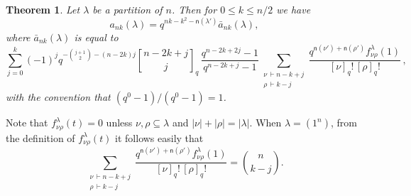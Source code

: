 \documentclass[12pt,a4paper,reqno]{amsart}
\theoremstyle{plain}
\newtheorem{theorem}{Theorem}[section]
\theoremstyle{definition}
\newcommand{\FF}{{\mathbb{F}}}
\newcommand{\1}{\mathds{1}}
\renewcommand{\u}{\mathfrak{u}}
\newcommand{\fn}{\mathsf{n}}
\DeclareMathOperator{\rk}{rank}
\begin{document}
\begin{theorem}\label{anklambda-explicit} Let $\lambda$ be a partition of $n$. Then 
for $0\leq k\leq n/2$ we have 
\[
a_{nk}(\lambda)=q^{nk-k^2-\fn(\lambda')} \bar a_{nk}(\lambda),
\] where $\bar a_{nk}(\lambda)$ is equal to 
\begin{equation*}
\sum_{j=0}^k (-1)^jq^{-\binom{j+1}{2}-(n-2k)j}{n-2k+j\brack j}_q\,\frac{q^{n-2k+2j}-1}{q^{n-2k+j}-1} \sum_{\substack{\nu\, \vdash n-k+j\\ \rho\,\vdash k-j}}\frac{q^{\fn(\nu')+\fn(\rho')}f_{\nu\rho}^\lambda(1)}{[\nu]_q!\,[\rho]_q!}\, ,    
\end{equation*}
with the convention that $(q^0-1)/(q^0-1)=1$. 

  
\end{theorem}
Note that $f_{\nu\rho}^\lambda(t)=0$ unless $\nu,\rho\subseteq \lambda$ and $|\nu|+|\rho|=|\lambda|$.
When $\lambda=(1^n)$, from the definition of $f_{\nu\rho
}^\lambda(t)$ it follows easily that \begin{equation}\label{Hall}
\sum_{\substack{\nu\, \vdash n-k+j\\ \rho\,\vdash k-j}}\frac{q^{\fn(\nu')+\fn(\rho')}f_{\nu\rho}^\lambda(1)}{[\nu]_q!\,[\rho]_q!}=\binom{n}{k-j}.
\end{equation}
\end{document}
